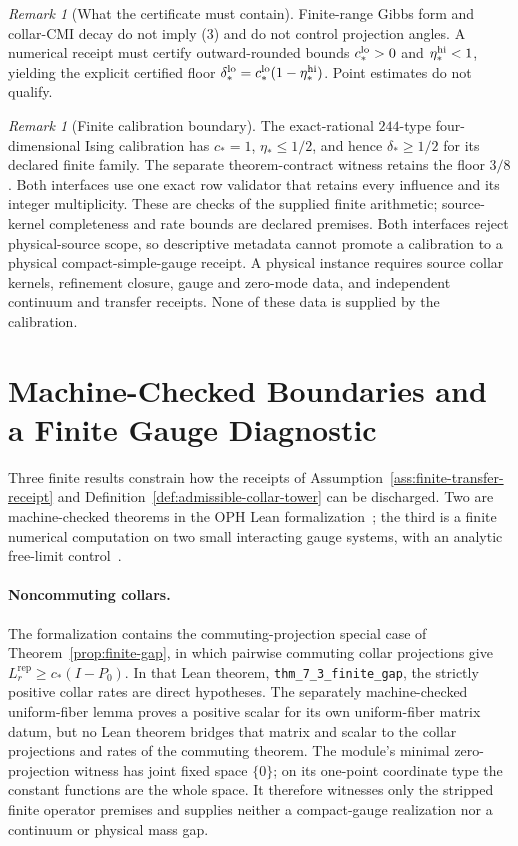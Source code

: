 \documentclass[11pt]{article}
\numberwithin{equation}{section}
\theoremstyle{remark}
\newtheorem{remark}[theorem]{Remark}
\newcommand{\Rep}{\mathrm{rep}}
\begin{document}
\begin{remark}[What the certificate must contain]
Finite-range Gibbs form and collar-CMI decay do not imply (3) and do not control projection
angles.  A numerical receipt must certify outward-rounded bounds \(c_*^{\rm lo}>0\) and
\(\eta_*^{\rm hi}<1\), yielding the explicit certified floor
\(\delta_*^{\rm lo}=c_*^{\rm lo}(1-\eta_*^{\rm hi})\).  Point estimates do not qualify.
\end{remark}

\begin{remark}[Finite calibration boundary]
The exact-rational \(244\)-type four-dimensional Ising calibration has \(c_*=1\), \(\eta_*\le1/2\), and hence
\(\delta_*\ge1/2\) for its declared finite family. The separate theorem-contract
witness retains the floor \(3/8\). Both interfaces use one exact row
validator that retains every influence and its integer multiplicity. These
are checks of the supplied finite arithmetic; source-kernel completeness and
rate bounds are declared premises. Both interfaces reject physical-source
scope, so descriptive metadata cannot promote a calibration to a physical
compact-simple-gauge receipt. A physical instance requires source
collar kernels, refinement closure, gauge and zero-mode data, and independent
continuum and transfer receipts. None of these data is supplied by the
calibration.
\end{remark}

\section{Machine-Checked Boundaries and a Finite Gauge Diagnostic}
\label{sec:boundaries}

Three finite results constrain how the receipts of
Assumption~\ref{ass:finite-transfer-receipt} and
Definition~\ref{def:admissible-collar-tower} can be discharged. Two are
machine-checked theorems in the OPH Lean formalization~\cite{ophlean}; the third is
a finite numerical computation on two small interacting gauge systems, with
an analytic free-limit control~\cite{ophz2}.

\paragraph{Noncommuting collars.}
The formalization contains the commuting-projection special case of
Theorem~\ref{prop:finite-gap}, in which pairwise commuting collar projections
give \(L^{\Rep}_r\ge c_*(I-P_0)\).  In that Lean theorem,
\texttt{thm\_7\_3\_finite\_gap}, the strictly positive collar rates are direct
hypotheses.  The separately machine-checked uniform-fiber lemma proves a positive
scalar for its own uniform-fiber matrix datum, but no Lean
theorem bridges that matrix and scalar to the collar projections and rates of
the commuting theorem.  The module's minimal zero-projection witness has joint
fixed space \(\{0\}\); on its one-point coordinate type the constant functions
are the whole space.  It therefore witnesses only the stripped finite operator
premises and supplies neither a compact-gauge realization nor a continuum or
physical mass gap.
\end{document}

